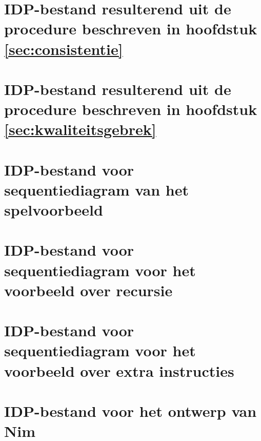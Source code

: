 \chapter{IDP-bestand resulterend uit de procedure beschreven in hoofdstuk \ref{sec:consistentie}}\label{app:consistentie}

\label{code:consistentie}

\chapter{IDP-bestand resulterend uit de procedure beschreven in hoofdstuk \ref{sec:kwaliteitsgebrek}}\label{app:kwaliteitsgebrek}

\label{code:kwaliteitsgebrek}

\chapter{IDP-bestand voor sequentiediagram van het spelvoorbeeld}\label{app:seq-diagram-game}

\label{code:seq-diagram-game}

\chapter{IDP-bestand voor sequentiediagram voor het voorbeeld over recursie}\label{app:seq-recursion}

\label{code:seq-recursion}

\chapter{IDP-bestand voor sequentiediagram voor het voorbeeld over extra instructies}\label{app:new-nim}

\label{code:new-nim}

\chapter{IDP-bestand voor het ontwerp van Nim}

\label{code:nim-eval}